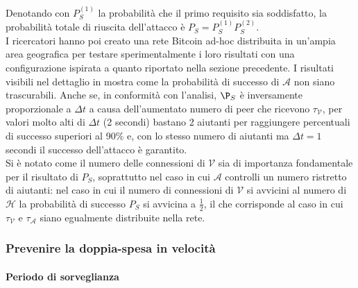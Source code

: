 Denotando con $P^{\left(1\right)}_S$ la probabilità che il primo requisito sia soddisfatto, la probabilità totale di riuscita dell'attacco è $P_S = P^{\left(1\right)}_S P^{\left(2\right)}_S$.\\
I ricercatori hanno poi creato una rete Bitcoin ad-hoc distribuita in un'ampia area geografica per testare sperimentalmente i loro risultati con una configurazione ispirata a quanto riportato nella sezione precedente. I risultati visibili nel dettaglio in \cite{doublespendig_fast} mostra come la probabilità di successo di $\mathcal{A}$ non siano trascurabili. Anche se, in conformità con l'analisi, $\P_S$ è inversamente proporzionale a $\Delta t$ a causa dell'aumentato numero di peer che ricevono $\tau_\mathcal{V}$, per valori molto alti di $\Delta t$ (2 secondi) bastano 2 aiutanti per raggiungere percentuali di successo superiori al 90\% e, con lo stesso numero di aiutanti ma $\Delta t = 1$ secondi il successo dell'attacco è garantito.\\
Si è notato come il numero delle connessioni di $\mathcal{V}$ sia di importanza fondamentale per il risultato di $P_S$, soprattutto nel caso in cui $\mathcal{A}$ controlli un numero ristretto di aiutanti: nel caso in cui il numero di connessioni di $\mathcal{V}$ si avvicini al numero di $\mathcal{H}$ la probabilità di successo $P_S$ si avvicina a $\frac{1}{2}$, il che corrisponde al caso in cui $\tau_\mathcal{V}$ e $\tau_\mathcal{A}$ siano egualmente distribuite nella rete.

\subsubsection{Prevenire la doppia-spesa in velocità}\label{prevenzione-doppia-spesa}

\paragraph{Periodo di sorveglianza}

